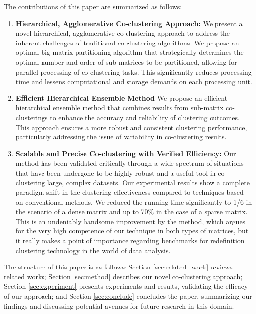 The contributions of this paper are summarized as follows:
\begin{enumerate}
    \item \textbf{Hierarchical, Agglomerative Co-clustering Approach: }We present a novel hierarchical, agglomerative co-clustering approach to address the inherent challenges of traditional co-clustering algorithms. We propose an optimal big matrix partitioning algorithm that strategically determines the optimal number and order of sub-matrices to be partitioned, allowing for parallel processing of co-clustering tasks. This significantly reduces processing time and lessens computational and storage demands on each processing unit.
    \item \textbf{Efficient Hierarchical Ensemble Method} We propose an efficient hierarchical ensemble method that combines results from sub-matrix co-clusterings to enhance the accuracy and reliability of clustering outcomes. This approach ensures a more robust and consistent clustering performance, particularly addressing the issue of variability in co-clustering results.
    \item \textbf{Scalable and Precise Co-clustering with Verified Efficiency: } Our method has been validated critically through a wide spectrum of situations that have been undergone to be highly robust and a useful tool in co-clustering large, complex datasets. Our experimental results show a complete paradigm shift in the clustering effectiveness compared to techniques based on conventional methods. 
    We reduced the running time significantly to 1/6 in the scenario of a dense matrix and up to 70\% in the case of a sparse matrix.
    This is an undeniably handsome improvement by the method, which argues for the very high competence of our technique in both types of matrices, but it really makes a point of importance regarding benchmarks for redefinition clustering technology in the world of data analysis. 
\end{enumerate}

The structure of this paper is as follows: Section \ref{sec:related_work} reviews related works; Section \ref{sec:method} describes our novel co-clustering approach; Section \ref{sec:experiment} presents experiments and results, validating the efficacy of our approach; and Section \ref{sec:conclude} concludes the paper, summarizing our findings and discussing potential avenues for future research in this domain.
